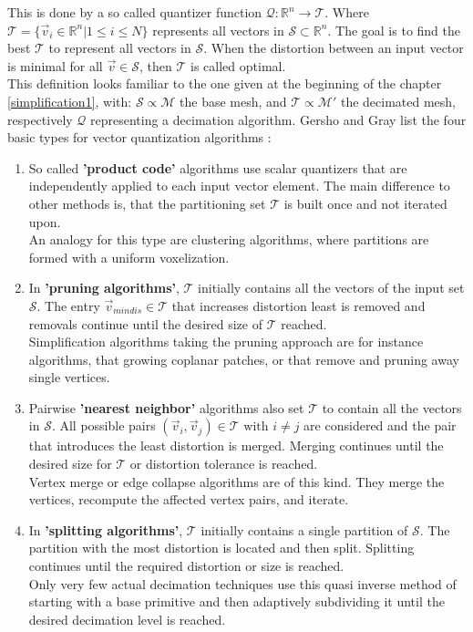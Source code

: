 This is done by a so called quantizer function $\mathcal{Q}: \mathbb{R}^{n} \rightarrow \mathcal{T}$.
Where $\mathcal{T} = \{\vec{v}_{i} \in \mathbb{R}^{n} | 1 \leq i \leq N\}$ represents all vectors in $\mathcal{S} \subset \mathbb{R}^{n}$.
The goal is to find the best $\mathcal{T}$ to represent all vectors in $\mathcal{S}$.
When the distortion between an input vector is minimal for all $\vec{v} \in \mathcal{S}$, then $\mathcal{T}$ is called optimal.\\
This definition looks familiar to the one given at the beginning of the chapter \ref{simplification1}, with: $\mathcal{S} \propto \mathcal{M}$ the base mesh, and $\mathcal{T} \propto \mathcal{M'}$ the decimated mesh, respectively $\mathcal{Q}$ representing a decimation algorithm.
Gersho and Gray list the four basic types for vector quantization algorithms \citep[][cf. pp.358 ff.]{Gersho1991}:
\begin{enumerate}
	\item So called \textbf{'product code'} algorithms use scalar quantizers that are independently applied to each input vector element.
	The main difference to other methods is, that the partitioning set $\mathcal{T}$ is built once and not iterated upon.\\
	An analogy for this type are clustering algorithms, where partitions are formed with a uniform voxelization.	
	\item  In \textbf{'pruning algorithms'}, $\mathcal{T}$ initially contains all the vectors of the input set $\mathcal{S}$. The entry $\vec{v}_{mindis} \in \mathcal{T}$ that increases distortion least is removed and removals continue until the desired size of $\mathcal{T}$ reached.\\
	Simplification algorithms taking the pruning approach are for instance algorithms, that growing coplanar patches, or that remove and pruning away single vertices.
	\item Pairwise \textbf{'nearest neighbor'} algorithms also set $\mathcal{T}$ to contain all the vectors in $\mathcal{S}$. All possible pairs $(\vec{v}_{i},\vec{v}_{j}) \in \mathcal{T} \text{ with } i\neq j$ are considered and the pair that introduces the least distortion is merged. Merging continues until the desired size for $\mathcal{T}$ or distortion tolerance is reached.\\
	Vertex merge or edge collapse algorithms are of this kind. They merge the vertices, recompute the affected vertex pairs, and iterate.
	\item In \textbf{'splitting algorithms'}, $\mathcal{T}$ initially contains a single partition of $\mathcal{S}$. The partition with the most distortion is located and then split. Splitting continues until the required distortion or size is reached.\\
	Only very few actual decimation techniques use this quasi inverse method of starting with a base primitive and then adaptively subdividing it until the desired decimation level is reached.
\end{enumerate}
